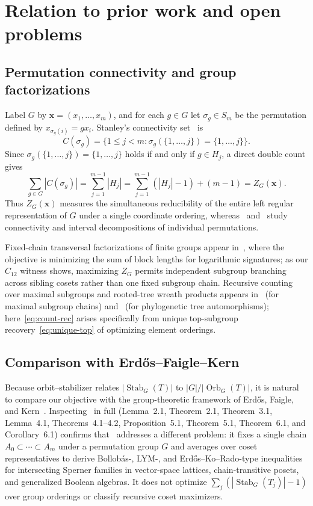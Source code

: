 \documentclass[11pt,reqno]{amsart}
\numberwithin{equation}{section}
\theoremstyle{definition}
\theoremstyle{remark}
\newcommand{\Stab}{\operatorname{Stab}}
\newcommand{\Orb}{\operatorname{Orb}}
\begin{document}
\section{Relation to prior work and open problems}
\label{sec:prior}

\subsection{Permutation connectivity and group factorizations}
Label $G$ by $\mathbf{x}=(x_1,\ldots,x_m)$, and for each $g\in G$ let $\sigma_g\in S_m$ be the permutation defined by $x_{\sigma_g(i)}=gx_i$. Stanley's connectivity set~\cite{Sta05} is
\[
C(\sigma_g) = \bigl\{1\le j<m : \sigma_g(\{1,\ldots,j\}) = \{1,\ldots,j\}\bigr\}.
\]
Since $\sigma_g(\{1,\ldots,j\})=\{1,\ldots,j\}$ holds if and only if $g\in H_j$, a direct double count gives
\[
\sum_{g\in G} |C(\sigma_g)| = \sum_{j=1}^{m-1} |H_j| = \sum_{j=1}^{m-1}(|H_j|-1) + (m-1) = Z_G(\mathbf{x}).
\]
Thus $Z_G(\mathbf{x})$ measures the simultaneous reducibility of the entire left regular representation of $G$ under a single coordinate ordering, whereas~\cite{Sta05} and~\cite{Cal04} study connectivity and interval decompositions of individual permutations.

Fixed-chain transversal factorizations of finite groups appear in~\cite{GVS03}, where the objective is minimizing the sum of block lengths for logarithmic signatures; as our $C_{12}$ witness shows, maximizing $Z_G$ permits independent subgroup branching across sibling cosets rather than one fixed subgroup chain. Recursive counting over maximal subgroups and rooted-tree wreath products appears in~\cite{ST09} (for maximal subgroup chains) and~\cite{MBKK18} (for phylogenetic tree automorphisms); here~\eqref{eq:count-rec} arises specifically from unique top-subgroup recovery~\eqref{eq:unique-top} of optimizing element orderings.

\subsection{Comparison with Erd\H{o}s--Faigle--Kern}
Because orbit--stabilizer relates $|\Stab_G(T)|$ to $|G|/|\Orb_G(T)|$, it is natural to compare our objective with the group-theoretic framework of Erd\H{o}s, Faigle, and Kern~\cite{EFK92}. Inspecting~\cite{EFK92} in full (Lemma~2.1, Theorem~2.1, Theorem~3.1, Lemma~4.1, Theorems~4.1--4.2, Proposition~5.1, Theorem~5.1, Theorem~6.1, and Corollary~6.1) confirms that~\cite{EFK92} addresses a different problem: it fixes a single chain $A_0\subset\cdots\subset A_m$ under a permutation group $G$ and averages over coset representatives to derive Bollob\'as-, LYM-, and Erd\H{o}s--Ko--Rado-type inequalities for intersecting Sperner families in vector-space lattices, chain-transitive posets, and generalized Boolean algebras. It does not optimize $\sum_j (|\Stab_G(T_j)|-1)$ over group orderings or classify recursive coset maximizers.
\end{document}
